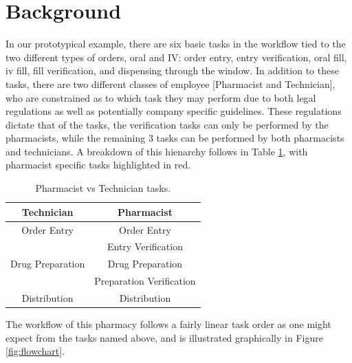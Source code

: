 \documentclass[10pt]{report}            %
\begin{document}
\section*{Background}
In our prototypical example, there are six basic tasks in the workflow tied to the two different types of orders, oral and IV: order entry, entry verification, oral fill, iv fill, fill verification, and dispensing through the window. In addition to these tasks, there are two different classes of employee [Pharmacist and Technician], who are constrained as to which task they may perform due to both legal regulations as well as potentially company specific guidelines. These regulations dictate that of the tasks, the verification tasks can only be performed by the pharmacists, while the remaining 3 tasks can be performed by both pharmacists and technicians. A breakdown of this hienarchy follows in Table \ref{table:tasks}, with pharmacist specific tasks highlighted in red.
\begin{table}[h]
\centering
\begin{tabular}{|c||c|}
\hline
Technician & Pharmacist\\\hline\hline
Order Entry & Order Entry \\\hline
& \cellcolor{red!25}Entry Verification \\\hline
Drug Preparation & Drug Preparation\\\hline
& \cellcolor{red!25}Preparation Verification\\\hline
Distribution & Distribution\\\hline
\end{tabular}
\caption{Pharmacist vs Technician tasks.}
\label{table:tasks}
\end{table}
The workflow of this pharmacy follows a fairly linear task order as one might expect from the tasks named above, and is illustrated graphically in Figure \ref{fig:flowchart}.
\end{document}
